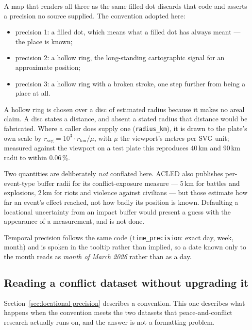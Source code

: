 \documentclass[11pt]{article}
\begin{document}
A map that renders all three as the same filled dot discards that code
and asserts a precision no source supplied. The convention adopted here:

\begin{itemize}
  \item precision 1: a filled dot, which means what a filled dot has
        always meant --- the place is known;
  \item precision 2: a hollow ring, the long-standing cartographic signal
        for an approximate position;
  \item precision 3: a hollow ring with a broken stroke, one step further
        from being a place at all.
\end{itemize}

A hollow ring is chosen over a disc of estimated radius because it makes
no areal claim. A disc states a distance, and absent a stated radius that
distance would be fabricated. Where a caller does supply one
(\texttt{radius\_km}), it is drawn to the plate's own scale by
$r_{\mathrm{svg}} = 10^{3} \cdot r_{\mathrm{km}} / \mu$, with $\mu$ the
viewport's metres per SVG unit; measured against the viewport on a
test plate this reproduces 40\,km and 90\,km radii to within 0.06\,\%.

Two quantities are deliberately \emph{not} conflated here. ACLED also
publishes per-event-type buffer radii for its conflict-exposure measure
--- 5\,km for battles and explosions, 2\,km for riots and violence
against civilians --- but those estimate how far an event's effect
reached, not how badly its position is known. Defaulting a locational
uncertainty from an impact buffer would present a guess with the
appearance of a measurement, and is not done.

Temporal precision follows the same code
(\texttt{time\_precision}: exact day, week, month) and is spoken in the
tooltip rather than implied, so a date known only to the month reads as
\emph{month of March 2026} rather than as a day.

\subsection{Reading a conflict dataset without upgrading it}
\label{sec:conflict-datasets}
\label{sec:conflict-data}

Section~\ref{sec:locational-precision} describes a convention. This one
describes what happens when the convention meets the two datasets that
peace-and-conflict research actually runs on, and the answer is not a
formatting problem.
\end{document}
